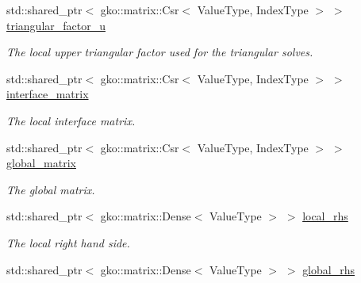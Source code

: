 \begin{DoxyCompactItemize}
\mbox{\label{classschwz_1_1SchwarzBase_adfb4459647e875717ea8812859f09fea}} 
std\+::shared\+\_\+ptr$<$ gko\+::matrix\+::\+Csr$<$ Value\+Type, Index\+Type $>$ $>$ \hyperlink{classschwz_1_1SchwarzBase_adfb4459647e875717ea8812859f09fea}{triangular\+\_\+factor\+\_\+u}
\begin{DoxyCompactList}\small\item\em The local upper triangular factor used for the triangular solves. \end{DoxyCompactList}\item 
\mbox{\label{classschwz_1_1SchwarzBase_a1e9742522b50a7bebe936b6540694f72}} 
std\+::shared\+\_\+ptr$<$ gko\+::matrix\+::\+Csr$<$ Value\+Type, Index\+Type $>$ $>$ \hyperlink{classschwz_1_1SchwarzBase_a1e9742522b50a7bebe936b6540694f72}{interface\+\_\+matrix}
\begin{DoxyCompactList}\small\item\em The local interface matrix. \end{DoxyCompactList}\item 
\mbox{\label{classschwz_1_1SchwarzBase_a3539b68fb6ff07a8f58b1f990976dc90}} 
std\+::shared\+\_\+ptr$<$ gko\+::matrix\+::\+Csr$<$ Value\+Type, Index\+Type $>$ $>$ \hyperlink{classschwz_1_1SchwarzBase_a3539b68fb6ff07a8f58b1f990976dc90}{global\+\_\+matrix}
\begin{DoxyCompactList}\small\item\em The global matrix. \end{DoxyCompactList}\item 
\mbox{\label{classschwz_1_1SchwarzBase_ac28b3e811e6016f31836fe366ff56eb7}} 
std\+::shared\+\_\+ptr$<$ gko\+::matrix\+::\+Dense$<$ Value\+Type $>$ $>$ \hyperlink{classschwz_1_1SchwarzBase_ac28b3e811e6016f31836fe366ff56eb7}{local\+\_\+rhs}
\begin{DoxyCompactList}\small\item\em The local right hand side. \end{DoxyCompactList}\item 
\mbox{\label{classschwz_1_1SchwarzBase_a1a6313c3ce53d7868a1b87b807f1a1ce}} 
std\+::shared\+\_\+ptr$<$ gko\+::matrix\+::\+Dense$<$ Value\+Type $>$ $>$ \hyperlink{classschwz_1_1SchwarzBase_a1a6313c3ce53d7868a1b87b807f1a1ce}{global\+\_\+rhs}

\end{DoxyCompactItemize}
